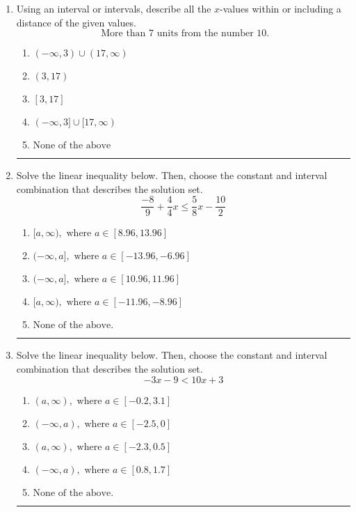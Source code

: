 \documentclass[14pt]{extbook}
\newcommand{\litem}[1]{\item#1\hspace*{-1cm}\rule{\textwidth}{0.4pt}}
\begin{document}
\begin{enumerate}
{\begin{enumerate}[label=\Alph*.]
\end{enumerate} }
\litem{
Using an interval or intervals, describe all the $x$-values within or including a distance of the given values.\[ \text{ More than } 7 \text{ units from the number } 10. \]\begin{enumerate}[label=\Alph*.]
\item \( (-\infty, 3) \cup (17, \infty) \)
\item \( (3, 17) \)
\item \( [3, 17] \)
\item \( (-\infty, 3] \cup [17, \infty) \)
\item \( \text{None of the above} \)

\end{enumerate} }
\litem{
Solve the linear inequality below. Then, choose the constant and interval combination that describes the solution set.\[ \frac{-8}{9} + \frac{4}{4} x \leq \frac{5}{8} x - \frac{10}{2} \]\begin{enumerate}[label=\Alph*.]
\item \( [a, \infty), \text{ where } a \in [8.96, 13.96] \)
\item \( (-\infty, a], \text{ where } a \in [-13.96, -6.96] \)
\item \( (-\infty, a], \text{ where } a \in [10.96, 11.96] \)
\item \( [a, \infty), \text{ where } a \in [-11.96, -8.96] \)
\item \( \text{None of the above}. \)

\end{enumerate} }
\litem{
Solve the linear inequality below. Then, choose the constant and interval combination that describes the solution set.\[ -3x -9 < 10x + 3 \]\begin{enumerate}[label=\Alph*.]
\item \( (a, \infty), \text{ where } a \in [-0.2, 3.1] \)
\item \( (-\infty, a), \text{ where } a \in [-2.5, 0] \)
\item \( (a, \infty), \text{ where } a \in [-2.3, 0.5] \)
\item \( (-\infty, a), \text{ where } a \in [0.8, 1.7] \)
\item \( \text{None of the above}. \)

\end{enumerate} }
\end{enumerate}
\end{document}
